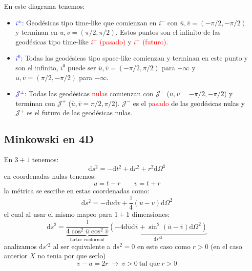 \documentclass[../main]{subfiles}
\begin{document}
\begin{adjustwidth}{0pt}{-100pt}
En este diagrama tenemos:
\begin{itemize}
    \item \textcolor{blue}{$i^{\pm}$:} Geodésicas tipo time-like que comienzan en $i^-$ con $\bar{u}, \bar{v}=(-\pi/2, -\pi/2)$ y terminan en $\bar{u}, \bar{v}=(\pi/2, \pi/2)$. Estos puntos son el infinito de las geodésicas tipo time-like \textcolor{red}{$i^-$ (pasado)} y \textcolor{red}{$i^+$ (futuro).}
    \item \textcolor{blue}{$i^{0}$:} Todas las geodésicas tipo space-like comienzan y terminan en este punto y son el infinito, $i^{0}$ puede ser $\bar{u}, \bar{v}=(-\pi/2, \pi/2)$ para $+\infty$ y $\bar{u}, \bar{v}=(\pi/2, -\pi/2)$ para $-\infty$.
    \item \textcolor{blue}{$\mathcal{J}^{\pm}$:} Todas las geodésicas \textcolor{red}{nulas} comienzan con $\mathcal{J}^-$ ($\bar{u}, \bar{v}=-\pi/2, -\pi/2$) y terminan con $\mathcal{J}^+$ ($\bar{u}, \bar{v}=\pi/2, \pi/2$). $\mathcal{J}^-$ es el \textcolor{red}{pasado} de las geodésicas nulas y $\mathcal{J}^+$ es el futuro de las geodésicas nulas.
\end{itemize}

\subsection{Minkowski en 4D}

En $3+1$ tenemos:
\begin{equation}
    \mathrm{d}s^2=-\mathrm{d}t^2+\mathrm{d}r^2+r^2\mathrm{d}\Omega^2
\end{equation}
en coordenadas nulas tenemos:
\begin{equation}
    u=t-r\qquad v=t+r
\end{equation}
la métrica se escribe en estas coordenadas como:
\begin{equation}
    \mathrm{d}s^2=-\mathrm{d}u\mathrm{d}v+\dfrac{1}{4}(u-v)\mathrm{d}\Omega^2
\end{equation}
el cual al usar el mismo mapeo para $1+1$ dimensiones:
\begin{equation}
    \mathrm{d}s^2=\underbrace{\dfrac{1}{4\cos^2 \bar{u} \cos^2 \bar{v}}}_{\text{factor conformal}} \underbrace{(-4\mathrm{d}\bar{u}\mathrm{d}\bar{v}+\sin^2(\bar{u}-\bar{v})\mathrm{d}\Omega^2)}_{\mathrm{d}s'{}^2}
\end{equation}
analizamos $\mathrm{d}s'{}^2$ al ser equivalente a $\mathrm{d}s^2=0$ en este caso como $r>0$ (en el caso anterior $X$ no tenia por que serlo)
\begin{equation}
    v-u=2r \ \rightarrow \ v>0 \ \text{tal que} \ r>0
\end{equation}


\end{adjustwidth}
\end{document}

